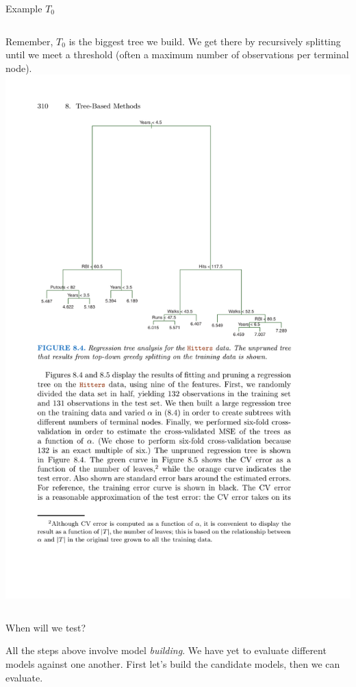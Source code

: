 \documentclass[mathserif, aspectratio=169]{beamer}
\begin{document}
\begin{frame}{Example $T_0$}
\begin{columns}
Remember, $T_0$ is the biggest tree we build.  We get there by recursively splitting until we meet a threshold (often a maximum number of observations per terminal node).
\includegraphics[height=0.9\textheight]{complex_tree}

\end{columns}

\end{frame}

\begin{frame}{When will we test?}

All the steps above involve model \textit{building}.  We have yet to evaluate different models against one another.  First let's build the candidate models, then we can evaluate.
\end{frame}
\end{document}
